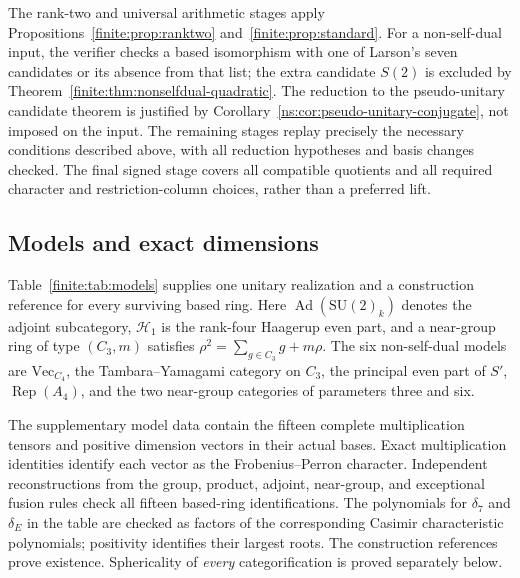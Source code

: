 

The rank-two and universal arithmetic stages apply
Propositions~\ref{finite:prop:ranktwo} and~\ref{finite:prop:standard}.
For a non-self-dual input, the verifier checks a based isomorphism with
one of Larson's seven candidates or its absence from that list; the
extra candidate $S(2)$ is excluded by
Theorem~\ref{finite:thm:nonselfdual-quadratic}.
The reduction to the pseudo-unitary candidate theorem is justified by
Corollary~\ref{ns:cor:pseudo-unitary-conjugate}, not imposed on the input.
The remaining stages replay precisely the necessary conditions described
above, with all reduction hypotheses and basis changes checked.
The final signed stage covers all compatible quotients and all required
character and restriction-column choices, rather than a preferred lift.

\subsection{Models and exact dimensions}
Table~\ref{finite:tab:models} supplies one unitary realization and a
construction reference for every surviving based ring. Here
$\operatorname{Ad}(\mathrm{SU}(2)_k)$ denotes the adjoint subcategory,
$\mathcal H_1$ is the rank-four Haagerup even part, and a near-group ring
of type $(C_3,m)$ satisfies
$\rho^2=\sum_{g\in C_3}g+m\rho$.
The six non-self-dual models are
$\mathrm{Vec}_{C_4}$, the Tambara--Yamagami category on $C_3$,
the principal even part of $S'$, $\operatorname{Rep}(A_4)$, and the
two near-group categories of parameters three and six.

The supplementary model data contain the fifteen complete multiplication
tensors and positive dimension vectors in their actual bases. Exact
multiplication identities identify each vector as the Frobenius--Perron
character. Independent reconstructions from the group, product, adjoint,
near-group, and exceptional fusion rules check all fifteen based-ring
identifications. The polynomials for $\delta_7$ and $\delta_E$ in the table
are checked as factors of the corresponding Casimir characteristic
polynomials; positivity identifies their largest roots. The construction
references prove existence. Sphericality of \emph{every} categorification
is proved separately below.

